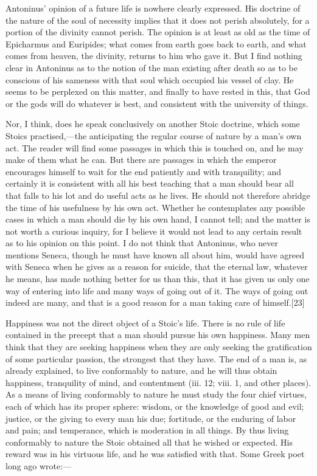 Antoninus' opinion of a future life is nowhere clearly expressed. His doctrine of the nature of the soul of necessity implies that it does not perish absolutely, for a portion of the divinity cannot perish. The opinion is at least as old as the time of Epicharmus and Euripides; what comes from earth goes back to earth, and what comes from heaven, the divinity, returns to him who gave it. But I find nothing clear in Antoninus as to the notion of the man existing after death so as to be conscious of his sameness with that soul which occupied his vessel of clay. He seems to be perplexed on this matter, and finally to have rested in this, that God or the gods will do whatever is best, and consistent with the university of things.

Nor, I think, does he speak conclusively on another Stoic doctrine, which some Stoics practised,—the anticipating the regular course of nature by a man's own act. The reader will find some passages in which this is touched on, and he may make of them what he can. But there are passages in which the emperor encourages himself to wait for the end patiently and with tranquility; and certainly it is consistent with all his best teaching that a man should bear all that falls to his lot and do useful acts as he lives. He should not therefore abridge the time of his usefulness by his own act. Whether he contemplates any possible cases in which a man should die by his own hand, I cannot tell; and the matter is not worth a curious inquiry, for I believe it would not lead to any certain result as to his opinion on this point. I do not think that Antoninus, who never mentions Seneca, though he must have known all about him, would have agreed with Seneca when he gives as a reason for suicide, that the eternal law, whatever he means, has made nothing better for us than this, that it has given us only one way of entering into life and many ways of going out of it. The ways of going out indeed are many, and that is a good reason for a man taking care of himself.[23]

Happiness was not the direct object of a Stoic's life. There is no rule of life contained in the precept that a man should pursue his own happiness. Many men think that they are seeking happiness when they are only seeking the gratification of some particular passion, the strongest that they have. The end of a man is, as already explained, to live conformably to nature, and he will thus obtain happiness, tranquility of mind, and contentment (iii. 12; viii. 1, and other places). As a means of living conformably to nature he must study the four chief virtues, each of which has its proper sphere: wisdom, or the knowledge of good and evil; justice, or the giving to every man his due; fortitude, or the enduring of labor and pain; and temperance, which is moderation in all things. By thus living conformably to nature the Stoic obtained all that he wished or expected. His reward was in his virtuous life, and he was satisfied with that. Some Greek poet long ago wrote:—


